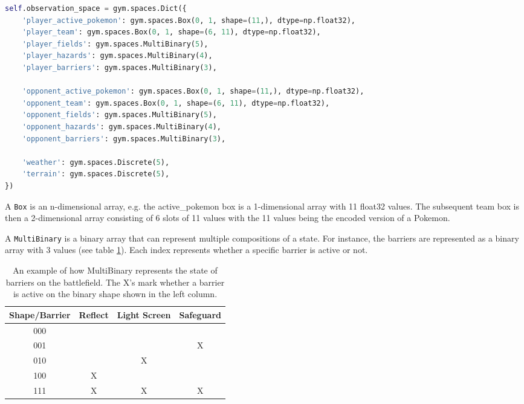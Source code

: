 \begin{lstlisting}[basicstyle=\fontsize{10}{10}\selectfont\ttfamily,language=Python,caption={The shape of the observation space.},label=lst:observation-space-def,breaklines]
self.observation_space = gym.spaces.Dict({
    'player_active_pokemon': gym.spaces.Box(0, 1, shape=(11,), dtype=np.float32),
    'player_team': gym.spaces.Box(0, 1, shape=(6, 11), dtype=np.float32),
    'player_fields': gym.spaces.MultiBinary(5),
    'player_hazards': gym.spaces.MultiBinary(4),
    'player_barriers': gym.spaces.MultiBinary(3),

    'opponent_active_pokemon': gym.spaces.Box(0, 1, shape=(11,), dtype=np.float32),
    'opponent_team': gym.spaces.Box(0, 1, shape=(6, 11), dtype=np.float32),
    'opponent_fields': gym.spaces.MultiBinary(5),
    'opponent_hazards': gym.spaces.MultiBinary(4),
    'opponent_barriers': gym.spaces.MultiBinary(3),

    'weather': gym.spaces.Discrete(5),
    'terrain': gym.spaces.Discrete(5),
})
\end{lstlisting}

A \lstinline|Box| is an n-dimensional array, e.g. the active\_pokemon box is a 1-dimensional array with 11 float32 values.
The subsequent team box is then a 2-dimensional array consisting of 6 slots of 11 values with the 11 values being the encoded
version of a Pokemon.

A \lstinline|MultiBinary| is a binary array that can represent multiple compositions of a state. For instance, the barriers are
represented as a binary array with 3 values (see table \ref{tab:multibinary-barrier-example}). Each index represents whether a specific barrier is active or not.

\begin{table}[h]
    \centering
    \begin{tabular}{|c|c|c|c|}
        \hline
        Shape/Barrier & Reflect & Light Screen & Safeguard \\\hline
        000           &         &              &           \\\hline
        001           &         &              & X         \\\hline
        010           &         & X            &           \\\hline
        100           & X       &              &           \\\hline
        111           & X       & X            & X         \\\hline
    \end{tabular}
    \label{tab:multibinary-barrier-example}
    \caption{An example of how MultiBinary represents the state of barriers on the battlefield. The X's mark whether a
        barrier is active on the binary shape shown in the left column.}
\end{table}

